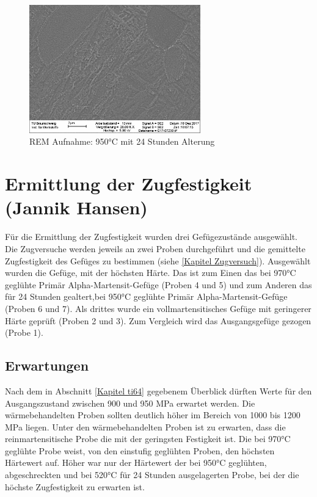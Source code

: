 \documentclass[a4paper, 11pt]{tubsreprt}
\begin{document}
\begin{figure}
\centering
\includegraphics[width=0.66\textwidth]{Bilder/REM950C1hWQ520C24hAC.png}
\caption{REM Aufnahme: 950°C mit 24 Stunden Alterung}
\label{REM 950C 24h}
\end{figure}

\section{Ermittlung der Zugfestigkeit (Jannik Hansen)}\label{Kapitel ermittlung der Zugfestigkeit}

Für die Ermittlung der Zugfestigkeit wurden drei Gefügezustände ausgewählt. Die Zugversuche werden jeweils an zwei Proben durchgeführt und die gemittelte Zugfestigkeit des Gefüges zu bestimmen (siehe  \ref{Kapitel Zugversuch}). Ausgewählt wurden die Gefüge, mit der höchsten Härte. Das ist zum Einen das bei 970°C geglühte Primär Alpha-Martensit-Gefüge (Proben 4 und 5) und zum Anderen das für 24 Stunden gealtert,bei 950°C geglühte Primär Alpha-Martensit-Gefüge (Proben 6 und 7). Als drittes wurde ein vollmartensitisches Gefüge mit geringerer Härte geprüft (Proben 2 und 3). Zum Vergleich wird das Ausgangsgefüge gezogen (Probe 1).
\subsection*{Erwartungen}
Nach dem in Abschnitt \ref{Kapitel ti64} gegebenem Überblick dürften Werte für den Ausgangszustand zwischen 900 und 950 MPa erwartet werden. Die wärmebehandelten Proben sollten deutlich höher im Bereich von 1000 bis 1200 MPa liegen. Unter den wärmebehandelten Proben ist zu erwarten, dass die reinmartensitische Probe die mit der geringsten Festigkeit ist. Die bei 970°C geglühte Probe weist, von den einstufig geglühten Proben, den höchsten Härtewert auf. Höher war nur der Härtewert der bei 950°C geglühten, abgeschreckten und bei 520°C für 24 Stunden ausgelagerten Probe, bei der die höchste Zugfestigkeit zu erwarten ist.
\end{document}
